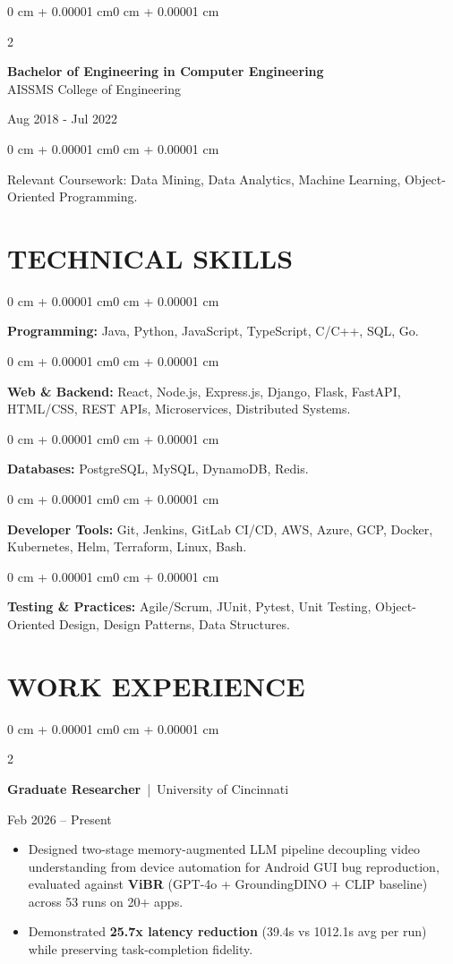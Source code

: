 \documentclass[10pt, letterpaper]{article}
\newenvironment{highlights}{
    \begin{itemize}[
        topsep=0.10 cm,
        parsep=0.06 cm,
        partopsep=0pt,
        itemsep=0.06 cm,
        leftmargin=12pt
    ]
}{
    \end{itemize}
}
\newenvironment{onecolentry}{
    \begin{adjustwidth}{0 cm + 0.00001 cm}{0 cm + 0.00001 cm}
}{
    \end{adjustwidth}
}
\newenvironment{twocolentry}[2][]{
    \onecolentry
    \def\secondColumn{#2}
    \setcolumnwidth{\fill, 4.5 cm}
    \begin{paracol}{2}
}{
    \switchcolumn \raggedleft \secondColumn
    \end{paracol}
    \endonecolentry
}
\begin{document}
\begin{twocolentry}{
    Aug 2018 - Jul 2022
}
    \textbf{Bachelor of Engineering in Computer Engineering} \\
    AISSMS College of Engineering
\end{twocolentry}
\begin{onecolentry}
Relevant Coursework: Data Mining, Data Analytics, Machine Learning, Object-Oriented Programming.
\end{onecolentry}
\section{TECHNICAL SKILLS}
\begin{onecolentry}
\textbf{Programming:} Java, Python, JavaScript, TypeScript, C/C++, SQL, Go.
\end{onecolentry}
\vspace{0.06 cm}
\begin{onecolentry}
\textbf{Web \& Backend:} React, Node.js, Express.js, Django, Flask, FastAPI, HTML/CSS, REST APIs, Microservices, Distributed Systems.
\end{onecolentry}
\vspace{0.06 cm}
\begin{onecolentry}
\textbf{Databases:} PostgreSQL, MySQL, DynamoDB, Redis.
\end{onecolentry}
\vspace{0.06 cm}
\begin{onecolentry}
\textbf{Developer Tools:} Git, Jenkins, GitLab CI/CD, AWS, Azure, GCP, Docker, Kubernetes, Helm, Terraform, Linux, Bash.
\end{onecolentry}
\vspace{0.06 cm}
\begin{onecolentry}
\textbf{Testing \& Practices:} Agile/Scrum, JUnit, Pytest, Unit Testing, Object-Oriented Design, Design Patterns, Data Structures.
\end{onecolentry}

\section{WORK EXPERIENCE}
\begin{twocolentry}{Feb 2026 -- Present}
\textbf{Graduate Researcher} \,|\, University of Cincinnati
\end{twocolentry}
\begin{highlights}
  \item Designed two-stage memory-augmented LLM pipeline decoupling video understanding from device automation for Android GUI bug reproduction, evaluated against \textbf{ViBR} (GPT-4o + GroundingDINO + CLIP baseline) across 53 runs on 20+ apps.
  \item Demonstrated \textbf{25.7x latency reduction} (39.4s vs 1012.1s avg per run) while preserving task-completion fidelity.
\end{highlights}
\end{document}
